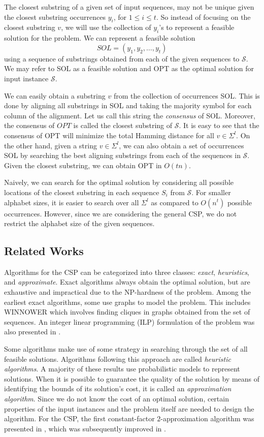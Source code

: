 \documentclass[journal]{acm_proc_article-sp}
\def\S{\ensuremath{\mathcal{S}}\xspace}
\begin{document}
The closest substring of a given set of input sequences, may not be unique given the closest substring  occurrences $y_i$, for $ 1 \leq i \leq t$.  So instead of focusing on the closest substring $v$, we will use the collection of $y_i$'s to represent a feasible solution for the problem. We can represent a feasible solution $$SOL = (y_1, y_2, \ldots, y_t)$$ using a sequence of substrings obtained from each of the given sequences to \S. We may refer to SOL as a feasible solution and OPT as the optimal solution for input instance \S.

We can easily obtain a substring $v$ from the collection of occurrences SOL. This is done by aligning all substrings in SOL and taking the majority symbol for each column of the alignment. Let us call this string the \textit{consensus} of SOL. Moreover, the consensus of $OPT$ is called the closest substring of \S. It is easy to see that the consensus of OPT will minimize the total Hamming distance for all  $v \in \Sigma^l$. On the other hand, given a string $v \in \Sigma^l$, we can also obtain a set of occurrences SOL by searching the best aligning substrings from each of the sequences in \S. Given the closest substring, we can obtain OPT in $O(tn)$. 

Naively, we can search for the optimal solution by considering all possible locations of the closest substring in each sequence $S_i$ from $\mathcal{S}$. For smaller alphabet sizes, it is easier to search over all $\Sigma^l$ as compared to $O(n^t)$ possible occurrences. However, since we are considering the general CSP, we do not restrict the alphabet size of the given sequences. 


\subsection{Related Works}
Algorithms for the CSP can be categorized into three classes: \textit{exact}, \textit{heuristics}, and \textit{approximate}. Exact algorithms always obtain the optimal solution, but are exhaustive and impractical due to the NP-hardness of the problem. Among the earliest exact algorithms, some use graphs to model the problem. This includes WINNOWER \cite{Pevzner2000} which involves finding cliques in graphs obtained from the set of sequences. An integer linear programming (ILP) formulation of the problem was also presented in \cite{Zaslavsky2006}.

Some algorithms make use of some strategy in searching through the set of all feasible solutions. Algorithms following this approach  are called \textit{heuristic algorithms}. A majority of these results use probabilistic models to represent solutions. When it is possible to guarantee the quality of the solution by means of identifying the bounds of its solution's cost, it is called an \textit{approximation algorithm}. Since we do not know the cost of an optimal solution, certain properties of the input instances and the problem itself are needed to design the algorithm. For the CSP, the first constant-factor $2$-approximation algorithm was presented in \cite{Lanctot1998}, which was subsequently  improved in \cite{Li1999}.
\end{document}
